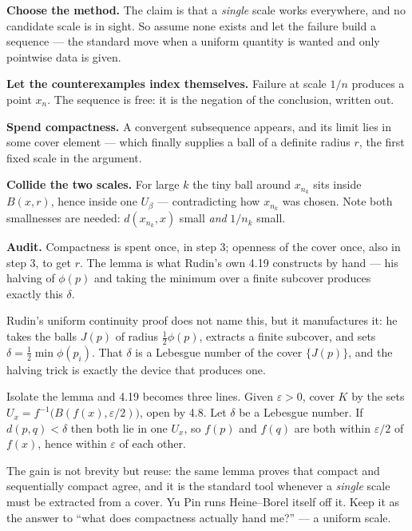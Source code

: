 \begin{proofwalk}
  \item \textbf{Choose the method.} The claim is that a \emph{single} scale
        works everywhere, and no candidate scale is in sight. So assume none
        exists and let the failure build a sequence --- the standard move
        when a uniform quantity is wanted and only pointwise data is given.
  \item \textbf{Let the counterexamples index themselves.} Failure at scale
        $1/n$ produces a point $x_n$. The sequence is free: it is the
        negation of the conclusion, written out.
  \item \textbf{Spend compactness.} A convergent subsequence appears, and its
        limit lies in some cover element --- which finally supplies a ball of
        a definite radius $r$, the first fixed scale in the argument.
  \item \textbf{Collide the two scales.} For large $k$ the tiny ball around
        $x_{n_k}$ sits inside $B(x,r)$, hence inside one $U_\beta$ ---
        contradicting how $x_{n_k}$ was chosen. Note both smallnesses are
        needed: $d(x_{n_k},x)$ small \emph{and} $1/n_k$ small.
  \item \textbf{Audit.} Compactness is spent once, in step 3; openness of the
        cover once, also in step 3, to get $r$. The lemma is what Rudin's own
        4.19 constructs by hand --- his halving of $\phi(p)$ and taking the
        minimum over a finite subcover produces exactly this $\delta$.
\end{proofwalk}

\begin{unpack}
Rudin's uniform continuity proof does not name this, but it manufactures it:
he takes the balls $J(p)$ of radius $\tfrac12\phi(p)$, extracts a finite
subcover, and sets $\delta = \tfrac12\min\phi(p_i)$. That $\delta$ is a
Lebesgue number of the cover $\{J(p)\}$, and the halving trick is exactly the
device that produces one.

Isolate the lemma and 4.19 becomes three lines. Given $\varepsilon>0$, cover
$K$ by the sets $U_x = f^{-1}\bigl(B(f(x),\varepsilon/2)\bigr)$, open by 4.8.
Let $\delta$ be a Lebesgue number. If $d(p,q)<\delta$ then both lie in one
$U_x$, so $f(p)$ and $f(q)$ are both within $\varepsilon/2$ of $f(x)$, hence
within $\varepsilon$ of each other.

The gain is not brevity but reuse: the same lemma proves that compact and
sequentially compact agree, and it is the standard tool whenever a
\emph{single} scale must be extracted from a cover. Yu Pin runs
Heine--Borel itself off it. Keep it as the answer to ``what does compactness
actually hand me?'' --- a uniform scale.
\end{unpack}

